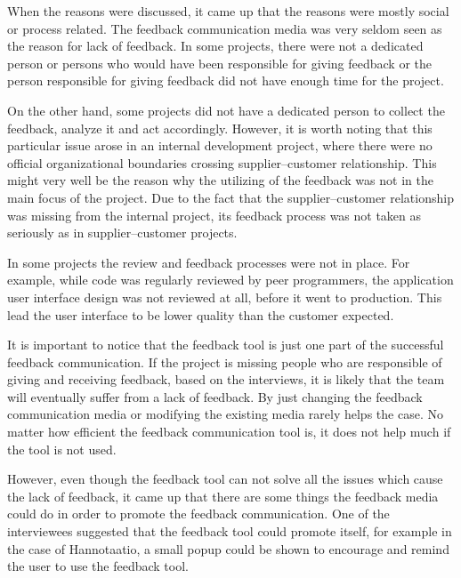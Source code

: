 \documentclass[english,12pt,a4paper,pdftex]{article}
\begin{document}
When the reasons were discussed, it came up that the reasons were mostly social or process related. The feedback communication media was very seldom seen as the reason for lack of feedback. In some projects, there were not a dedicated person or persons who would have been responsible for giving feedback or the person responsible for giving feedback did not have enough time for the project. 

On the other hand, some projects did not have a dedicated person to collect the feedback, analyze it and act accordingly. However, it is worth noting that this particular issue arose in an internal development project, where there were no official organizational boundaries crossing supplier--customer relationship. This might very well be the reason why the utilizing of the feedback was not in the main focus of the project. Due to the fact that the supplier--customer relationship was missing from the internal project, its feedback process was not taken as seriously as in supplier--customer projects.

In some projects the review and feedback processes were not in place. For example, while code was regularly reviewed by peer programmers, the application user interface design was not reviewed at all, before it went to production. This lead the user interface to be lower quality than the customer expected.

It is important to notice that the feedback tool is just one part of the successful feedback communication. If the project is missing people who are responsible of giving and receiving feedback, based on the interviews, it is likely that the team will eventually suffer from a lack of feedback. By just changing the feedback communication media or modifying the existing media rarely helps the case. No matter how efficient the feedback communication tool is, it does not help much if the tool is not used.

However, even though the feedback tool can not solve all the issues which cause the lack of feedback, it came up that there are some things the feedback media could do in order to promote the feedback communication. One of the interviewees suggested that the feedback tool could promote itself, for example in the case of Hannotaatio, a small popup could be shown to encourage and remind the user to use the feedback tool. 
\end{document}

